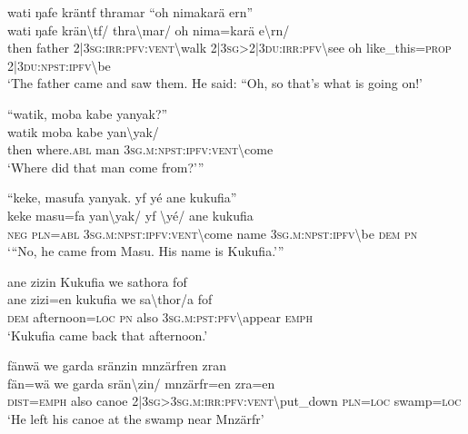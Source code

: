 \ea\label{ex:9:a2314}
wati ŋafe kräntf thramar ``oh nimakarä ern''\\
\gll wati	ŋafe	krän{\textbackslash}tf/	thra{\textbackslash}mar/	oh	nima=karä	e{\textbackslash}rn/\\
     then	father	2|3\textsc{sg}:\textsc{irr}:\textsc{pfv}:\textsc{vent}{\textbackslash}walk	2|3\textsc{sg}>2|3\textsc{du}:\textsc{irr}:\textsc{pfv}{\textbackslash}see	oh	like\_this=\textsc{prop}	2|3\textsc{du}:\textsc{npst}:\textsc{ipfv}{\textbackslash}be\\
\glt `The father came and saw them. He said: ``Oh, so that's what is going on!'
\z

\ea\label{ex:9:a2316}
``watik, moba kabe yanyak?''\\
\gll watik	moba	kabe	yan{\textbackslash}yak/\\
     then	where.\textsc{abl}	man	3\textsc{sg}.\textsc{m}:\textsc{npst}:\textsc{ipfv}:\textsc{vent}{\textbackslash}come\\
\glt `Where did that man come from?'''
\z

\ea\label{ex:9:a4924}
``keke, masufa yanyak. yf yé ane kukufia''\\
\gll keke	masu=fa	yan{\textbackslash}yak/	yf	{\textbackslash}yé/	ane	kukufia\\
     \textsc{neg}	\textsc{pln}=\textsc{abl}	3\textsc{sg}.\textsc{m}:\textsc{npst}:\textsc{ipfv}:\textsc{vent}{\textbackslash}come	name	3\textsc{sg}.\textsc{m}:\textsc{npst}:\textsc{ipfv}{\textbackslash}be	\textsc{dem}	\textsc{pn}\\
\glt `{``}No, he came from Masu. His name is Kukufia.'''
\z

\ea\label{ex:9:a2319}
ane zizin Kukufia we sathora fof\\
\gll ane	zizi=en	kukufia	we	sa{\textbackslash}thor/a	fof\\
     \textsc{dem}	afternoon=\textsc{loc}	\textsc{pn}	also	3\textsc{sg}.\textsc{m}:\textsc{pst}:\textsc{pfv}{\textbackslash}appear	\textsc{emph}\\
\glt `Kukufia came back that afternoon.'
\z

\ea\label{ex:9:a2321}
fänwä we garda sränzin mnzärfren zran\\
\gll fän=wä	we	garda	srän{\textbackslash}zin/	mnzärfr=en	zra=en\\
     \textsc{dist}=\textsc{emph}	also	canoe	2|3\textsc{sg}>3\textsc{sg}.\textsc{m}:\textsc{irr}:\textsc{pfv}:\textsc{vent}{\textbackslash}put\_down	\textsc{pln}=\textsc{loc}	swamp=\textsc{loc}\\
\glt `He left his canoe at the swamp near Mnzärfr'
\z

